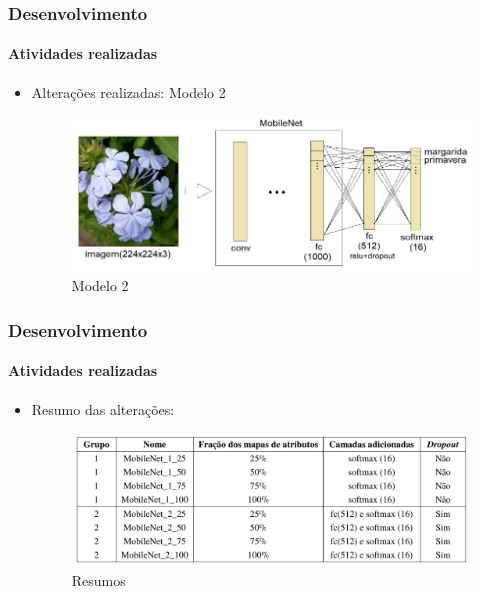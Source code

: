 \documentclass{beamer}
\begin{document}
    \begin{frame}
      \frametitle{Desenvolvimento}
      \framesubtitle{Atividades realizadas}      
      \begin{itemize}
        \item<1-> Alterações realizadas: Modelo 2
        		 \begin{figure}[hbt]
      		 	\begin{center}
      				\includegraphics[height=0.35\textwidth]{img/model2.png}
      			\end{center}
      			\caption{Modelo 2~\cite{computer-1209641}}
      		\end{figure}
      \end{itemize}
    \end{frame}
    
    \begin{frame}
      \frametitle{Desenvolvimento}
      \framesubtitle{Atividades realizadas}      
      \begin{itemize}
        \item<1-> Resumo das alterações: \medskip
        \begin{figure}[hbt]
      		 	\begin{center}
      				\includegraphics[height=.3 \textwidth]{img/models_table.png}
      			\end{center}
      			\caption{Resumos~\cite{computer-1209641}}
      		\end{figure}
      \end{itemize}
    \end{frame}
    
\end{document}
